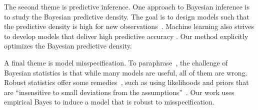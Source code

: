 The second theme is predictive inference.  One approach to Bayesian
inference is to study the Bayesian predictive density. The goal is to
design models such that the predictive density is high for new
observations~\citep{geisser1993predictive}. Machine learning also
strives to develop models that deliver high predictive accuracy
\citep{bishop2006pattern}.  Our method explicitly optimizes the
Bayesian predictive density.

A final theme is model misspecification.  To
paraphrase~\citet{box1987empirical}, the challenge of Bayesian
statistics is that while many models are useful, all of them are wrong.
Robust statistics offer some remedies~\citep{berger1994overview},
such as using likelihoods and priors that are ``insensitive to small
deviations from the assumptions''~\citep{huber2009robust}. Our work
uses empirical Bayes to induce a model that is robust to
misspecification.

